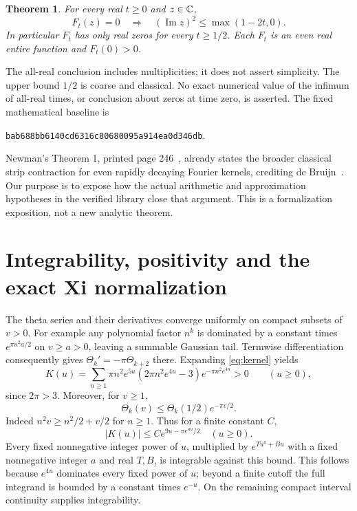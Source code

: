 \documentclass[11pt]{article}
\newtheorem{theorem}{Theorem}[section]
\begin{document}
\begin{theorem}\label{thm:main}
For every real $t\ge0$ and $z\in\mathbb C$,
\[
 F_t(z)=0\quad\Longrightarrow\quad
       (\operatorname{Im}z)^2\le\max(1-2t,0).
\]
In particular $F_t$ has only real zeros for every $t\ge1/2$.
Each $F_t$ is an even real entire function and $F_t(0)>0$.
\end{theorem}
The all-real conclusion includes multiplicities; it does not assert
simplicity. The upper bound $1/2$ is coarse and classical. No exact numerical value
of the infimum of all-real times, or conclusion about zeros at time zero,
is asserted. The fixed mathematical baseline is
\begin{center}\small\texttt{bab688bb6140cd6316c80680095a914ea0d346db}.\end{center}

Newman's Theorem 1, printed page 246~\cite{Newman}, already states the
broader classical strip contraction for even rapidly decaying Fourier
kernels, crediting de Bruijn~\cite{deBruijn}. Our purpose is to expose how
the actual arithmetic and approximation hypotheses in the verified
library close that argument. This is a formalization exposition, not a
new analytic theorem.

\section{Integrability, positivity and the exact Xi normalization}
The theta series and their derivatives converge uniformly on compact
subsets of $v>0$. For example any polynomial factor $n^k$ is dominated
by a constant times $e^{\pi n^2a/2}$ on $v\ge a>0$, leaving a summable
Gaussian tail. Termwise differentiation consequently gives
$\Theta_k'=-\pi\Theta_{k+2}$ there.
Expanding \eqref{eq:kernel} yields
\[
 K(u)=\sum_{n\ge1}\pi n^2e^{5u}
       (2\pi n^2e^{4u}-3)e^{-\pi n^2e^{4u}}>0\qquad(u\ge0),
\]
since $2\pi>3$. Moreover, for $v\ge1$,
\[
 \Theta_k(v)\le\Theta_k(1/2)e^{-\pi v/2}.
\]
Indeed $n^2v\ge n^2/2+v/2$ for $n\ge1$. Thus for a finite constant $C$,
\begin{equation}\label{eq:tail}
 |K(u)|\le C e^{9u-\pi e^{4u}/2}\quad(u\ge0).
\end{equation}
Every fixed nonnegative integer power of $u$, multiplied by
$e^{Tu^a+Bu}$ with a fixed nonnegative integer $a$ and real $T,B$,
is integrable against this bound. This follows because $e^{4u}$
dominates every fixed power of $u$; beyond a finite cutoff the full
integrand is bounded by a constant times $e^{-u}$. On the remaining
compact interval continuity supplies integrability.
\end{document}
